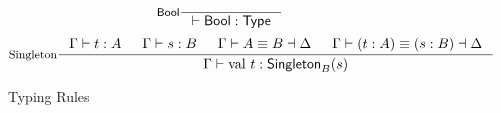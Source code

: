 \begin{figure*}[h]
  \[
    \inference[\Bool]{}
                    {\vdash \Bool : \Type}
  \]
  \[
    \inference[Singleton]{\Gamma \vdash t : A & \Gamma \vdash s : B & \Gamma \vdash A \equiv B \dashv \Delta & \Gamma \vdash (t : A) \equiv (s : B) \dashv \Delta}
                     {\Gamma \vdash \val{t} : \Singleton{B}{s}}
  \]

  \caption*{Typing Rules}
  \label{fig:base-dt-typing}
\end{figure*}
